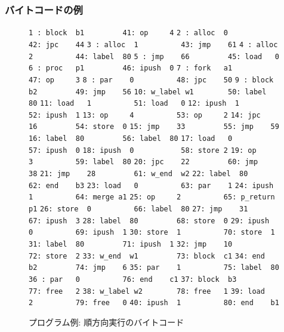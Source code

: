 \documentclass[submit,PRO]{ipsj}
\def\|{\verb|}
\begin{document}
\subsubsection{バイトコードの例}

\begin{figure}[tb]
\vbox{
\hbox{\|1 : block  b1         41: op     4|}
\hbox{\|2 : alloc  0          42: jpc    44|}
\hbox{\|3 : alloc  1          43: jmp    61|}
\hbox{\|4 : alloc  2          44: label  80|}
\hbox{\|5 : jmp    66         45: load   0|}
\hbox{\|6 : proc   p1         46: ipush  0|}
\hbox{\|7 : fork   a1         47: op     3|}
\hbox{\|8 : par    0          48: jpc    50|}
\hbox{\|9 : block  b2         49: jmp    56|}
\hbox{\|10: w_label w1        50: label  80|}
\hbox{\|11: load   1          51: load   0|}
\hbox{\|12: ipush  1          52: ipush  1|}
\hbox{\|13: op     4          53: op     2|}
\hbox{\|14: jpc    16         54: store  0|}
\hbox{\|15: jmp    33         55: jmp    59|}
\hbox{\|16: label  80         56: label  80|}
\hbox{\|17: load   0          57: ipush  0|}
\hbox{\|18: ipush  0           58: store 2|}
\hbox{\|19: op     3          59: label  80|}
\hbox{\|20: jpc    22         60: jmp    38|}
\hbox{\|21: jmp    28         61: w_end  w2|}
\hbox{\|22: label  80         62: end    b3|}
\hbox{\|23: load   0          63: par    1|}
\hbox{\|24: ipush  1          64: merge a1|}
\hbox{\|25: op     2          65: p_return p1|}
\hbox{\|26: store  0          66: label  80|}
\hbox{\|27: jmp    31         67: ipush  3|}
\hbox{\|28: label  80         68: store  0|}
\hbox{\|29: ipush  0          69: ipush  1|}
\hbox{\|30: store  1          70: store  1|}
\hbox{\|31: label  80         71: ipush  1|}
\hbox{\|32: jmp    10         72: store  2|}
\hbox{\|33: w_end  w1         73: block  c1|}
\hbox{\|34: end    b2         74: jmp    6|}
\hbox{\|35: par    1          75: label  80|}
\hbox{\|36 : par   0          76: end    c1|}
\hbox{\|37: block  b3         77: free   2|}
\hbox{\|38: w_label w2        78: free   1|}
\hbox{\|39: load   2          79: free   0|}
\hbox{\|40: ipush  1          80: end    b1|}
}
\centerline{}
\caption{プログラム例: 順方向実行のバイトコード}
\label{fig:bytecode}
\end{figure}
\end{document}
